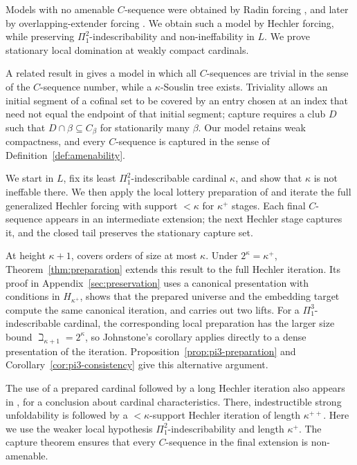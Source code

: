 \documentclass[11pt,a4paper]{amsart}
\theoremstyle{definition}
\theoremstyle{remark}
\begin{document}
Models with no amenable \(C\)-sequence were obtained by Radin
forcing \cite{BNZRad}, and later by overlapping-extender
forcing \cite{BNZApprox}. We obtain such a model by Hechler
forcing, while preserving \(\Pi^2_1\)-indescribability and
non-ineffability in \(L\). We prove stationary local
domination at weakly compact cardinals.

A related result in \cite{RYY} gives a model in which all
\(C\)-sequences are trivial in the sense of the
\(C\)-sequence number, while a \(\kappa\)-Souslin tree
exists. Triviality allows an initial segment of a cofinal
set to be covered by an entry chosen at an index that need
not equal the endpoint of that initial segment;
capture requires a club \(D\) such that
\(D\cap\beta\subseteq C_\beta\) for stationarily many
\(\beta\). Our model retains weak
compactness, and every \(C\)-sequence is captured in the
sense of Definition~\ref{def:amenability}.

We start in \(L\), fix its least
\(\Pi^2_1\)-indescribable cardinal \(\kappa\), and
show that \(\kappa\) is not ineffable there. We then
apply the local lottery preparation of \cite{Johnstone} and iterate
the full generalized Hechler forcing with support
\(<\kappa\) for \(\kappa^+\) stages. Each final
\(C\)-sequence appears in an intermediate extension;
the next Hechler stage captures it, and the closed tail
preserves the stationary capture set.

At height \(\kappa+1\), \cite[Corollary 38]{Johnstone} covers
orders of size at most \(\kappa\). Under \(2^\kappa=\kappa^+\),
Theorem~\ref{thm:preparation} extends this result to the full
Hechler iteration. Its proof in Appendix~\ref{sec:preservation}
uses a canonical presentation with conditions in \(H_{\kappa^+}\),
shows that the prepared universe and the embedding target
compute the same canonical iteration, and carries out two lifts.
For a \(\Pi^3_1\)-indescribable cardinal, the corresponding
local preparation has the larger size bound
\(\beth_{\kappa+1}=2^\kappa\), so Johnstone's corollary
applies directly to a dense presentation of the iteration.
Proposition~\ref{prop:pi3-preparation} and
Corollary~\ref{cor:pi3-consistency} give this alternative argument.

The use of a prepared cardinal followed by a long
Hechler iteration also appears in
\cite[Theorem 4.7]{Schuerz}, for a conclusion about
cardinal characteristics. There, indestructible strong
unfoldability is followed by a \(<\kappa\)-support
Hechler iteration of length \(\kappa^{++}\).
Here we use the weaker local hypothesis
\(\Pi^2_1\)-indescribability and length
\(\kappa^+\). The capture theorem ensures that every
\(C\)-sequence in the final extension is non-amenable.
\end{document}
